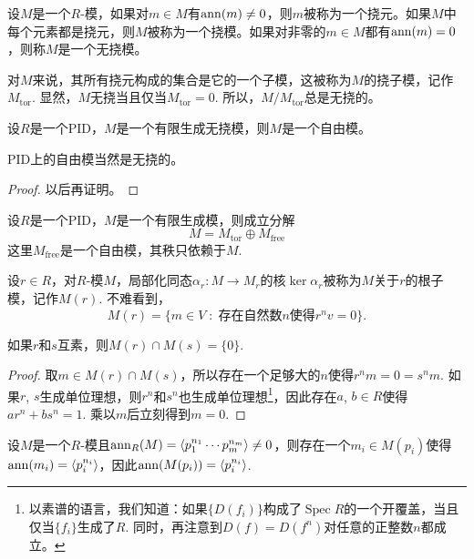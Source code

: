 \begin{para}[挠元、挠模]
	设$M$是一个$R$-模，如果对$m\in M$有$\operatorname{ann}(m)\neq 0$，则$m$被称为一个挠元。如果$M$中每个元素都是挠元，则$M$被称为一个挠模。如果对非零的$m\in M$都有$\operatorname{ann}(m)=0$，则称$M$是一个无挠模。
\end{para}

对$M$来说，其所有挠元构成的集合是它的一个子模，这被称为$M$的挠子模，记作$M_{\text{tor}}$. 显然，$M$无挠当且仅当$M_{\text{tor}}=0$. 所以，$M/M_{\text{tor}}$总是无挠的。

\begin{lem}
	设$R$是一个PID，$M$是一个有限生成无挠模，则$M$是一个自由模。
\end{lem}

PID上的自由模当然是无挠的。

\begin{proof}
	以后再证明。
\end{proof}

\begin{pro}
设$R$是一个PID，$M$是一个有限生成模，则成立分解
\[
	M=M_{\mathrm{tor}}\oplus M_{\mathrm{free}}
\]
这里$M_{\mathrm{free}}$是一个自由模，其秩只依赖于$M$.
\end{pro}

\begin{para}[根子模]
    设$r\in R$，对$R$-模$M$，局部化同态$\alpha_r:M\to M_r$的核$\ker \alpha_r$被称为$M$关于$r$的根子模，记作$M(r)$. 不难看到，
    \[
        M(r)=\{m\in V\;:\; \text{存在自然数$n$使得$r^nv=0$}\}.
    \]
\end{para}

\begin{lem}
    如果$r$和$s$互素，则$M(r)\cap M(s)=\{0\}$.
\end{lem}

\begin{proof}
    取$m\in M(r)\cap M(s)$，所以存在一个足够大的$n$使得$r^nm=0=s^nm$. 如果$r$, $s$生成单位理想，则$r^{n}$和$s^{n}$也生成单位理想\footnote{以素谱的语言，我们知道：如果$\{D(f_i)\}$构成了$\operatorname{Spec} R$的一个开覆盖，当且仅当$\{f_i\}$生成了$R$. 同时，再注意到$D(f)=D(f^n)$对任意的正整数$n$都成立。}，因此存在$a$, $b\in R$使得$ar^{n}+bs^{n}=1$. 乘以$m$后立刻得到$m=0$.
\end{proof}

\begin{lem}
    设$M$是一个$R$-模且$\operatorname{ann}_R(M)=\langle p_1^{n_1}\cdots p_m^{n_m}\rangle \neq 0$，则存在一个$m_i\in M(p_i)$使得$\operatorname{ann}(m_i)=\langle p_i^{n_i}\rangle$，因此$\operatorname{ann}(M(p_i))=\langle p_i^{n_i}\rangle$.
\end{lem}


